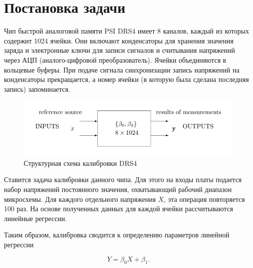 \section{Постановка задачи}
Чип быстрой аналоговой памяти PSI DRS4 имеет 8 каналов, каждый из которых содержит 1024 ячейки. Они включают конденсаторы для хранения значения заряда и электронные ключи для записи сигналов и считывания напряжений через АЦП (аналого-цифровой преобразователь). Ячейки объединяются в кольцевые буферы. При подаче сигнала синхронизации запись напряжений на конденсаторы прекращается, а номер ячейки (в которую была сделана последняя запись) запоминается.

\begin{figure}[H]
    \centering
    \includegraphics[width=1\linewidth]{image/Chip.png}
    \caption{Структурная схема калибровки DRS4}
    \label{fig:chip}
\end{figure}

Ставится задача калибровки данного чипа. Для этого на входы платы подается набор напряжений постоянного значения, охватывающий рабочий диапазон микросхемы. Для каждого отдельного напряжения $X$, эта операция повторяется 100 раз. На основе полученных данных для каждой ячейки рассчитываются линейные регрессии. 

Таким образом, калибровка сводится к определению параметров линейной регрессии 

\begin{equation}
    Y = \beta_0 X + \beta_1.
\end{equation}